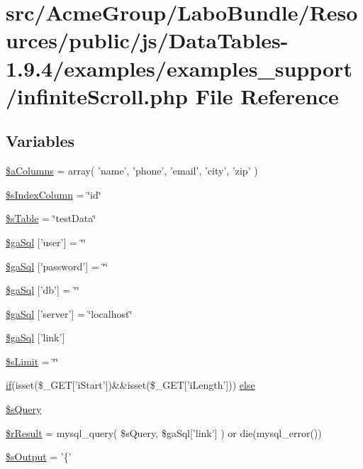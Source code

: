 \hypertarget{infinite_scroll_8php}{\section{src/\+Acme\+Group/\+Labo\+Bundle/\+Resources/public/js/\+Data\+Tables-\/1.9.4/examples/examples\+\_\+support/infinite\+Scroll.php File Reference}
\label{infinite_scroll_8php}
}
\subsection*{Variables}
\begin{DoxyCompactItemize}
\item 
\hyperlink{infinite_scroll_8php_aba12f5ba193beb8beb9fdd0a758711e8}{\$a\+Columns} = array( 'name', 'phone', 'email', 'city', 'zip' )
\item 
\hyperlink{infinite_scroll_8php_a8bddf0b8ded9777b9068de5fa9e217a2}{\$s\+Index\+Column} = \char`\"{}id\char`\"{}
\item 
\hyperlink{infinite_scroll_8php_a6b7d3b9c752a0c977de5ddae78b522a9}{\$s\+Table} = \char`\"{}test\+Data\char`\"{}
\item 
\hyperlink{infinite_scroll_8php_a08fc9fba5bf358871d1f80066f8930d1}{\$ga\+Sql} \mbox{[}'user'\mbox{]} = \char`\"{}\char`\"{}
\item 
\hyperlink{infinite_scroll_8php_a5a7f7a53d25bfc58a76a0132750c80eb}{\$ga\+Sql} \mbox{[}'password'\mbox{]} = \char`\"{}\char`\"{}
\item 
\hyperlink{infinite_scroll_8php_aaa5ffcba6d18eacf65c42024605b6486}{\$ga\+Sql} \mbox{[}'db'\mbox{]} = \char`\"{}\char`\"{}
\item 
\hyperlink{infinite_scroll_8php_a23a651ce4e9cd3741cb88709c0bfdf8e}{\$ga\+Sql} \mbox{[}'server'\mbox{]} = \char`\"{}localhost\char`\"{}
\item 
\hyperlink{infinite_scroll_8php_a57b1f46c51a5dafdbde39b16259c7e77}{\$ga\+Sql} \mbox{[}'link'\mbox{]}
\item 
\hyperlink{infinite_scroll_8php_a21edf730f95a442beb3e90314d1f0946}{\$s\+Limit} = \char`\"{}\char`\"{}
\item 
\hyperlink{fullpage_2plugin_8js_a8b98017e64ef036adb9ae327ff94abe1}{if}(isset(\$\+\_\+\+G\+E\+T\mbox{[}'i\+Start'\mbox{]})\&\&isset(\$\+\_\+\+G\+E\+T\mbox{[}'i\+Length'\mbox{]})) \hyperlink{infinite_scroll_8php_a14370e36fcb38f83a86ffa0d21a24cc9}{else}
\item 
\hyperlink{infinite_scroll_8php_a5175d5486118502db3f7aa1ccf7029cc}{\$s\+Query}
\item 
\hyperlink{infinite_scroll_8php_a8f423fcb1764890d70da997a4140f703}{\$r\+Result} = mysql\+\_\+query( \$s\+Query, \$ga\+Sql\mbox{[}'link'\mbox{]} ) or die(mysql\+\_\+error())
\item 
\hyperlink{infinite_scroll_8php_adf56804a2d67484675d7c58124c24385}{\$s\+Output} = '\{'
\end{DoxyCompactItemize}


